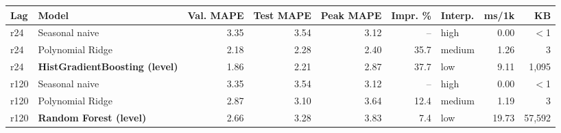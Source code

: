 \begin{tabular}{@{}llrrrrlrr@{}}
\toprule
Lag & Model & Val. MAPE & Test MAPE & Peak MAPE & Impr. \% & Interp. & ms/1k & KB \\
\midrule
r24 & Seasonal naive & 3.35 & 3.54 & 3.12 & -- & high & 0.00 & $<$1 \\
r24 & Polynomial Ridge & 2.18 & 2.28 & 2.40 & 35.7 & medium & 1.26 & 3 \\
r24 & \textbf{HistGradientBoosting (level)} & 1.86 & 2.21 & 2.87 & 37.7 & low & 9.11 & 1{,}095 \\
\midrule
r120 & Seasonal naive & 3.35 & 3.54 & 3.12 & -- & high & 0.00 & $<$1 \\
r120 & Polynomial Ridge & 2.87 & 3.10 & 3.64 & 12.4 & medium & 1.19 & 3 \\
r120 & \textbf{Random Forest (level)} & 2.66 & 3.28 & 3.83 & 7.4 & low & 19.73 & 57{,}592 \\
\bottomrule
\end{tabular}

